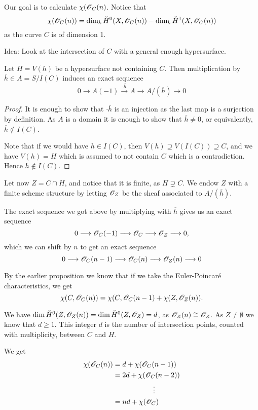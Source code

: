 Our goal is to calculate $\chi(\mathscr{O}_C(n)$. Notice that 
$$ \chi(\mathscr{O}_C(n)) = \dim_k\check{H}^0(X,\mathscr{O}_C(n))-\dim_k \check{H}^1(X, \mathscr{O}_C(n))$$ as the curve $C$ is of dimension 1. 

Idea: Look at the intersection of $C$ with a general enough hypersurface. 

\begin{proposition}
Let $H=V(h)$ be a hypersurface not containing $C$. Then multiplication by $\overline{h}\in A = S/I(C)$ induces an exact sequence 
$$ 0\longrightarrow A(-1)\overset{\cdot \overline{h}}\longrightarrow A \longrightarrow A/(\overline{h}) \longrightarrow 0 $$
\end{proposition}
\begin{proof}
It is enough to show that $\cdot \overline{h}$ is an injection as the last map is a surjection by definition. As $A$ is a domain it is enough to show that $\overline{h}\neq 0$, or equivalently, $\overline{h}\notin I(C)$. 

Note that if we would have $h\in I(C)$, then $V(h)\supseteq V(I(C)) \supseteq C$, and we have $V(h)=H$ which is assumed to not contain $C$ which is a contradiction. Hence $h\notin I(C)$. 
\end{proof}

Let now $Z = C\cap H$, and notice that it is finite, as $H\supsetneq C$. We endow $Z$ with a finite scheme structure by letting $\mathscr{O}_Z$ be the sheaf associated to $A/(\overline{h})$. 

The exact sequence we got above by multiplying with $\overline{h}$ gives us an exact sequence 
$$ 0\longrightarrow \mathscr{O}_C(-1)\longrightarrow \mathscr{O}_C \longrightarrow \mathscr{O}_Z \longrightarrow 0,  $$ which we can shift by $n$ to get an exact sequence 
$$ 0\longrightarrow \mathscr{O}_C(n-1)\longrightarrow \mathscr{O}_C(n) \longrightarrow \mathscr{O}_Z(n) \longrightarrow 0 $$

By the earlier proposition we know that if we take the Euler-Poincaré characteristics, we get 
$$ \chi(C, \mathscr{O}_C(n)) = \chi(C, \mathscr{O}_C(n-1) + \chi(Z, \mathscr{O}_Z(n)). $$

We have $\dim\check{H}^0(Z,\mathscr{O}_Z(n)) = \dim\check{H}^0(Z, \mathscr{O}_Z) = d$, as $\mathscr{O}_Z(n)\cong \mathscr{O}_Z$. As $Z\neq \emptyset$ we know that $d\geq 1$. 
This integer $d$ is the number of intersection points, counted with multiplicity, between $C$ and $H$. 

We get 
\begin{align*}
    \chi(\mathscr{O}_C(n))
    &= d + \chi(\mathscr{O}_C(n-1)) \\
    &= 2d + \chi(\mathscr{O}_C(n-2)) \\
    &\hspace{2cm}\vdots \\
    &= nd + \chi(\mathscr{O}_C)
\end{align*}


